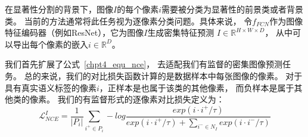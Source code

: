 在显著性分割的背景下，图像$I$的每个像素$i$需要被分类为显著性的前景类或者背景类。
当前的方法通常将此任务视为逐像素分类问题。具体来说，
令$f_{FCN}$作为图像特征编码器（例如ResNet\cite{he2016deep}），它为图像$I$生成密集特征预测
$I\in \mathbb{R}^{ H \times W \times D}$，
从中可以导出每个像素的嵌入$i \in  \mathbb{R}^{D}$。



我们首先扩展了公式~\ref{chpt4_equ_nce}，
去适配我们有监督的密集图像预测任务。
总的来说，我们的对比损失函数计算的是数据样本中每张图像的像素。
对于具有真实语义标签的像素$i$，正样本是也属于该类的其他像素，
而负样本是属于其他类的像素。
我们的有监督形式的逐像素对比损失定义为：
\begin{equation}
	\mathcal{L} _{NCE}^{I}= 
	\frac{1}{|P_{i}|}
	\sum_{i^{+}\in P_{i}}^{}  
	-log \frac
	{exp(i \cdot i^{+ }/\tau )}
	{exp(i \cdot i^{+}/\tau )+ \sum_{i^{-}\in N_{I}} exp(i \cdot i^{-}/\tau )} 
	\label{chpt4:eq:con_loss}
\end{equation}
% 
% 
% 
% 











